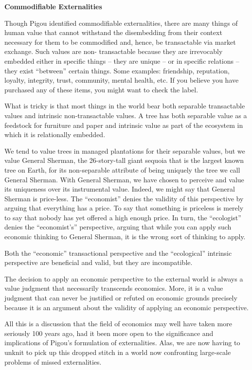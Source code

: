 \documentclass[
]{book}
\begin{document}
\textbf{Commodifiable Externalities}

Though Pigou identified commodifiable externalities, there are many things of human value
that cannot withstand the disembedding from their context necessary for them to be
commodified and, hence, be transactable via market exchange. Such values are non-
transactable because they are irrevocably embedded either in specific things -- they are
unique -- or in specific relations -- they exist ``between'' certain things. Some examples:
friendship, reputation, loyalty, integrity, trust, community, mental health, etc. If you believe you
have purchased any of these items, you might want to check the label.

What is tricky is that most things in the world bear both separable transactable values and
intrinsic non-transactable values. A tree has both separable value as a feedstock for furniture
and paper and intrinsic value as part of the ecosystem in which it is relationally embedded.

We tend to value trees in managed plantations for their separable values, but we value
General Sherman, the 26-story-tall giant sequoia that is the largest known tree on Earth, for
its non-separable attribute of being uniquely the tree we call General Sherman.
With General Sherman, we have chosen to perceive and value its uniqueness over its
instrumental value. Indeed, we might say that General Sherman is price-less. The
``economist'' denies the validity of this perspective by arguing that everything has a price. To
say that something is priceless is merely to say that nobody has yet offered a high enough
price.
In turn, the ``ecologist'' denies the ``economist's'' perspective, arguing that while you can apply
such economic thinking to General Sherman, it is the wrong sort of thinking to apply.

Both the ``economic'' transactional perspective and the ``ecological'' intrinsic perspective are
beneficial and valid, but they are incompatible.

The decision to
apply an economic perspective to the external world is always a value judgment that
necessarily transcends economics. More, it is a value judgment that can never be justified or
refuted on economic grounds precisely because it is an argument about the validity of
applying an economic perspective.

All this is a discussion that the field of economics may well have taken more seriously 100
years ago, had it been more open to the significance and implications of Pigou's formulation
of externalities. Alas, we are now having to unknit to pick up this dropped stitch in a world now
confronting large-scale problems of missed externalities.
\end{document}
